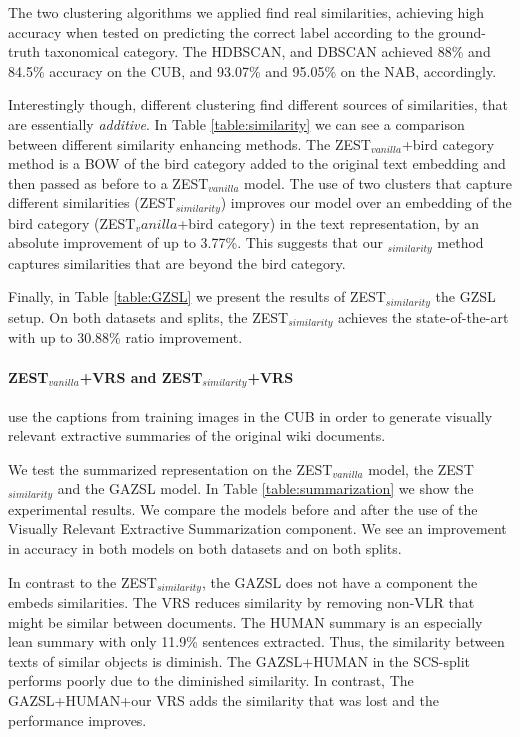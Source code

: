 \documentclass[11pt,a4paper]{article}
\newcommand\reut[1]{\textcolor{green}{\textbf{REUT:} #1 }}
\begin{document}


The two clustering algorithms we applied find real similarities, achieving high accuracy when tested on predicting the correct label according to the ground-truth taxonomical category. The HDBSCAN, and DBSCAN achieved 88\% and 84.5\% accuracy on the CUB, and 93.07\% and 95.05\% on the NAB, accordingly.

Interestingly though, different clustering find different sources of similarities, that are essentially {\em additive}. In Table \ref{table:similarity} we can see a comparison between different similarity enhancing methods. 
The ZEST$_{vanilla}$+bird category method is a BOW of the bird category added to the original text embedding and then passed as before to a ZEST$_{vanilla}$ model. 
The use of two clusters that capture different similarities (ZEST$_{similarity}$) improves our model over an embedding of the bird category (ZEST$_vanilla$+bird category) in the text representation, by an absolute improvement of up to 3.77\%. This suggests that our $_{similarity}$ method captures similarities that are beyond the bird category. %

Finally, 
in Table \ref{table:GZSL} we present the results of ZEST$_{similarity}$  the GZSL setup. On both datasets and splits, the ZEST$_{similarity}$ achieves the state-of-the-art with up to 30.88\% ratio improvement.

\paragraph{ ZEST$_{vanilla}$+VRS and ZEST$_{similarity}$+VRS }
use the captions from training images in the CUB in order to generate visually relevant extractive summaries of the original wiki documents.

We test the summarized representation on the ZEST$_{vanilla}$ model, the ZEST$_{similarity}$ and the GAZSL \citep{zhu2018generative} model. In Table \ref{table:summarization} we show the experimental results. We compare the models before and after the use of the Visually Relevant  Extractive Summarization component. We see an improvement in accuracy in both models on both datasets and on both splits. 

In contrast to the ZEST$_{similarity}$, the GAZSL does not have a component the embeds similarities. The VRS reduces similarity by removing non-VLR that might be similar between documents. 
The HUMAN summary is an especially lean summary with only 11.9\% sentences extracted. Thus, the similarity between texts of similar objects is diminish. The GAZSL+HUMAN in the SCS-split performs poorly due to the diminished similarity. In contrast, The GAZSL+HUMAN+our VRS adds the similarity that was lost and the performance improves.
\end{document}
